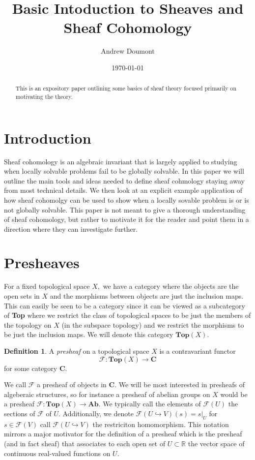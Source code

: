 \documentclass[psamsfonts]{amsart}
\title{Basic Intoduction to Sheaves and Sheaf Cohomology}
\author{Andrew Doumont}
\date{\today}
\theoremstyle{definition}
\newtheorem{defn}[thm]{Definition}
\theoremstyle{remark}
\numberwithin{equation}{section}
\begin{document}
\begin{abstract}
  This is an expository paper outlining some basics of sheaf theory focused primarily on motivating the theory.
  
  
\end{abstract}

\maketitle




\tableofcontents


\section{Introduction}
  Sheaf cohomology is an algebraic invariant that is largely applied to studying when locally solvable problems fail to be globally solvable. In this paper we will outline the main tools and ideas needed to define sheaf cohmology staying away from most technical details. We then look at an explicit example application of how sheaf cohomolgy can be used to show when a locally sovable problem is or is not globally solvable. This paper is not meant to give a thorough understanding of sheaf cohomology, but rather to motivate it for the reader and point them in a direction where they can investigate further.


\section{Presheaves}
  For a fixed topological space $X,$ we have a category where the objects are the open sets in $X$ and the morphisms between objects are just the inclusion maps. This can easily be seen to be a category since it can be viewed as a subcategory of 
  \textbf{Top} where we restrict the class of topological spaces to be just the members of the topology on $X$ (in the subspace topology) and we restrict the morphisms to be just the inclusion maps. We will denote this category $\textbf{Top}(X).$ \cite{hartshorne_1977} 
  
  \begin{defn}
    A \textit{presheaf} on a topological space $X$ is a contravariant functor 
    \[\mathscr{F}: \textbf{Top}(X) \to \textbf{C}\]
    for some category $\textbf{C}.$
  \end{defn}
   We call $\mathscr{F}$ a presheaf of objects in \textbf{C}. \cite{hartshorne_1977} We will be most interested in presheafs of algeberaic structures, so for instance a presheaf of abelian groups on $X$ would be a presheaf $\mathscr{F}:\textbf{Top}(X) \to \textbf{Ab}$. We typically call the elements of $\mathscr{F}(U)$ the sections of $\mathscr{F}$ of $U.$ Additionally, we denote $\mathscr{F}(U \hookrightarrow V)(s) = s|_U$ for $s \in \mathscr{F}(V)$ call $\mathscr{F}(U \hookrightarrow V)$ the restriciton homomorphism. This notation mirrors a major motivator for the definition of a presheaf which is the presheaf (and in fact sheaf) that associates to each open set of $U \subset \mathbb{R}$ the vector space of continuous real-valued functions on $U.$ 
\end{document}
